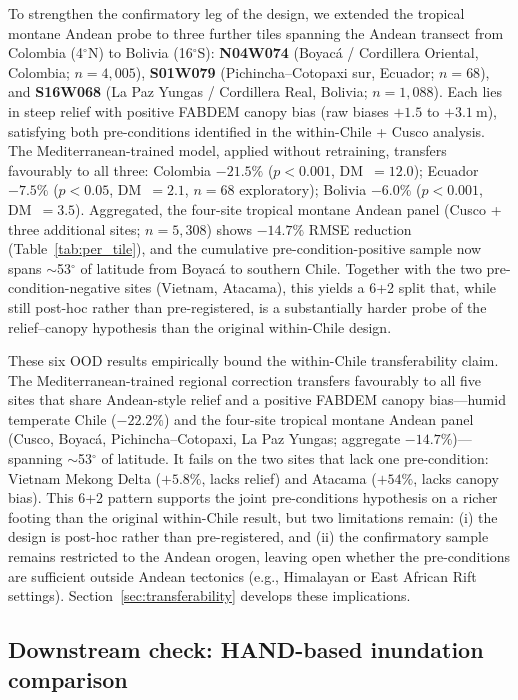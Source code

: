 \documentclass[preprint,authoryear,number]{elsarticle}
\begin{document}
To strengthen the confirmatory leg of the design, we extended the tropical montane Andean probe to three further tiles spanning the Andean transect from Colombia (4$^{\circ}$N) to Bolivia (16$^{\circ}$S): \textbf{N04W074} (Boyac\'a / Cordillera Oriental, Colombia; $n=4{,}005$), \textbf{S01W079} (Pichincha--Cotopaxi sur, Ecuador; $n=68$), and \textbf{S16W068} (La Paz Yungas / Cordillera Real, Bolivia; $n=1{,}088$). Each lies in steep relief with positive FABDEM canopy bias (raw biases $+1.5$ to $+\SI{3.1}{\meter}$), satisfying both pre-conditions identified in the within-Chile + Cusco analysis. The Mediterranean-trained model, applied without retraining, transfers favourably to all three: Colombia $-21.5\%$ ($p<0.001$, DM~$=12.0$); Ecuador $-7.5\%$ ($p<0.05$, DM~$=2.1$, $n=68$ exploratory); Bolivia $-6.0\%$ ($p<0.001$, DM~$=3.5$). Aggregated, the four-site tropical montane Andean panel (Cusco + three additional sites; $n=5{,}308$) shows $-14.7\%$ RMSE reduction (Table~\ref{tab:per_tile}), and the cumulative pre-condition-positive sample now spans $\sim$53$^{\circ}$ of latitude from Boyac\'a to southern Chile. Together with the two pre-condition-negative sites (Vietnam, Atacama), this yields a 6+2 split that, while still post-hoc rather than pre-registered, is a substantially harder probe of the relief--canopy hypothesis than the original within-Chile design.

These six OOD results empirically bound the within-Chile transferability claim. The Mediterranean-trained regional correction transfers favourably to all five sites that share Andean-style relief and a positive FABDEM canopy bias---humid temperate Chile ($-22.2\%$) and the four-site tropical montane Andean panel (Cusco, Boyac\'a, Pichincha--Cotopaxi, La Paz Yungas; aggregate $-14.7\%$)---spanning $\sim$53$^{\circ}$ of latitude. It fails on the two sites that lack one pre-condition: Vietnam Mekong Delta ($+5.8\%$, lacks relief) and Atacama ($+54\%$, lacks canopy bias). This 6+2 pattern supports the joint pre-conditions hypothesis on a richer footing than the original within-Chile result, but two limitations remain: (i) the design is post-hoc rather than pre-registered, and (ii) the confirmatory sample remains restricted to the Andean orogen, leaving open whether the pre-conditions are sufficient outside Andean tectonics (e.g., Himalayan or East African Rift settings). Section~\ref{sec:transferability} develops these implications.

\subsection{Downstream check: HAND-based inundation comparison}
\label{sec:hand_check}
\end{document}
